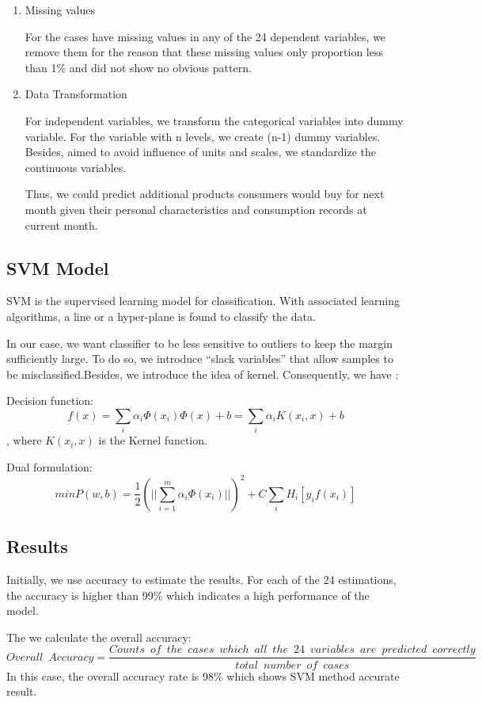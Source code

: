 \documentclass{article}
\begin{document}
\begin{spacing}{1}
\begin{large}
\begin{enumerate}
	\item  Missing values

	For the cases have missing values in any of the 24 dependent variables, we remove them for the reason that these missing values only proportion less than 1\% and did not show no obvious pattern.

	\item Data Transformation

	For independent variables, we transform the categorical variables into dummy variable. For the variable with n levels, we create (n-1) dummy variables. Besides, aimed to avoid influence of units and scales, we standardize the continuous variables.

	Thus, we could predict additional products consumers would buy for next month given their personal characteristics and consumption records at current month.
\end{enumerate}

\subsection{SVM Model}

SVM is the supervised learning model for classification. With associated learning algorithms, a line or a hyper-plane is found to classify the data.

In our case, we want classifier to be less sensitive to outliers to keep the margin sufficiently large. To do so, we introduce “slack variables” that allow samples to be misclassified.Besides, we introduce the idea of kernel. Consequently, we have :

Decision function:
$$f(x) = \displaystyle\sum_{i}\alpha_i\Phi(x_i)\Phi(x)+b = \displaystyle\sum_{i}\alpha_{i} K(x_i, x)+b$$, where $K(x_i, x)$ is the Kernel function.

Dual formulation:
$$min P(w,b) = \frac{1}{2}(||\displaystyle\sum_{i=1}^{m}\alpha_i\Phi(x_i)||)^2 + C\displaystyle\sum_{i}H_{i}[y_{i}f(x_i)]$$

\subsection{Results}

Initially, we use accuracy to estimate the results. For each of the 24 estimations, the accuracy is higher than 99\% which indicates a high performance of the model.

The we calculate the overall accuracy:
$$Overall\enspace Accuracy = \frac{Counts\enspace of\enspace the\enspace cases\enspace which\enspace all\enspace the\enspace 24\enspace variables\enspace are\enspace predicted\enspace correctly}{total\enspace number\enspace of\enspace cases}$$
In this case, the overall accuracy rate is 98\% which shows SVM method accurate result.


\end{large}
\end{spacing}
\end{document}
